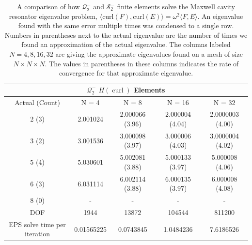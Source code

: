 \documentclass[format=acmsmall,screen,timestamp=false,a4paper]{acmart}
\DeclareMathOperator{\curl}{curl}
\newcommand{\hcurl}{\ensuremath{{H}(\curl)}\xspace}
\begin{document}
\begin{table}[htbp]
  \centering
  \caption{A comparison of how $ \mathcal{Q}^-_2$ and $\mathcal{S}^-_2$ finite elements solve the Maxwell cavity resonator eigenvalue problem, $\langle \text{curl}(F), \text{curl}(E) \rangle = \omega^2 \langle F, E \rangle$. An eigenvalue found with the same error multiple times was condensed to a single row.  Numbers in parentheses next to the actual eigenvalue are the number of times we found an approximation of the actual eigenvalue.  The columns labeled $N=4, 8, 16, 32$ are giving the approximate eigenvalues found on a mesh of size $N \times N \times N$.  The values in parentheses in these columns indicates the rate of convergence for that approximate eigenvalue.
\label{tab:Eigenvalue} }
\begin{tabular}{ c c c c c }
\multicolumn{5}{c}{$\mathcal{Q}^-_2$ \hcurl Elements} \\
\hline
Actual (Count) & N = 4 & N = 8 & N = 16 & N = 32 \\ 
\hline
2 (3) &2.001024 & 2.000066 (3.96) & 2.000004 (4.04) & 2.0000003 (4.00) \\  
3 (2) & 3.001536 & 3.000098 (3.97) & 3.000006 (4.03) & 3.0000004 (4.02) \\
5 (4) & 5.030601 & 5.002081 (3.88)& 5.000133 (3.97) & 5.000008 (4.06) \\
6 (3) & 6.031114 & 6.002114 (3.88) & 6.000135 (3.97) &  6.000008 (4.08) \\
8 (0) & - & -& - & - \\
\hline
DOF  & 1944 & 13872 & 104544 & 811200 \\
\hline
EPS solve time per iteration & 0.01565225 & 0.0743845 & 1.0484236 & 7.6186526 \\
\hline
\end{tabular} \\[1em]


\end{table}
\end{document}
